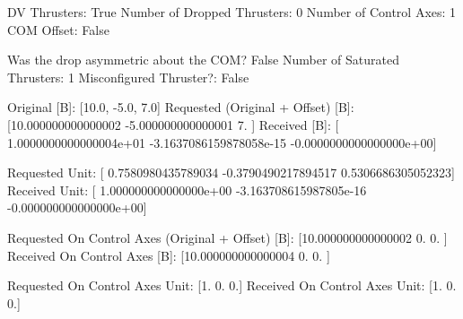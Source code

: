 DV Thrusters:	True
Number of Dropped Thrusters:	0
Number of Control Axes:	1
COM Offset:	False

Was the drop asymmetric about the COM?	False
Number of Saturated Thrusters:	1
Misconfigured Thruster?:	False

Original [B]:	[10.0, -5.0, 7.0]
Requested (Original + Offset) [B]:	[10.000000000000002 -5.000000000000001  7.               ]
Received [B]:		[ 1.0000000000000004e+01 -3.1637086159878058e-15 -0.0000000000000000e+00]

Requested Unit:		[ 0.7580980435789034 -0.3790490217894517  0.5306686305052323]
Received Unit:		[ 1.000000000000000e+00 -3.163708615987805e-16 -0.000000000000000e+00]

Requested On Control Axes (Original + Offset) [B]:	[10.000000000000002  0.                 0.               ]
Received On Control Axes [B]:		[10.000000000000004  0.                 0.               ]

Requested On Control Axes Unit:		[1. 0. 0.]
Received On Control Axes Unit:		[1. 0. 0.]

